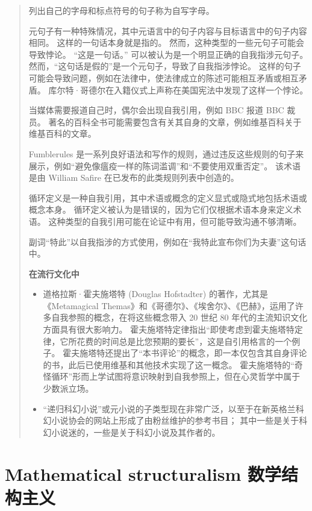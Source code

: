 \begin{quote}
列出自己的字母和标点符号的句子称为自写字母。

元句子有一种特殊情况，其中元语言中的句子内容与目标语言中的句子内容相同。
这样的一句话本身就是指的。 然而，这种类型的一些元句子可能会导致悖论。
``这是一句话。'' 可以被认为是一个明显正确的自我指涉元句子。
然而，``这句话是假的''是一个元句子，导致了自我指涉悖论。
这样的句子可能会导致问题，例如在法律中，使法律成立的陈述可能相互矛盾或相互矛盾。
库尔特·哥德尔在入籍仪式上声称在美国宪法中发现了这样一个悖论。

当媒体需要报道自己时，偶尔会出现自我引用，例如 BBC 报道 BBC 裁员。
著名的百科全书可能需要包含有关其自身的文章，例如维基百科关于维基百科的文章。

Fumblerules
是一系列良好语法和写作的规则，通过违反这些规则的句子来展示，例如``避免像瘟疫一样的陈词滥调''和``不要使用双重否定''。
该术语是由 William Safire 在已发布的此类规则列表中创造的。

循环定义是一种自我引用，其中术语或概念的定义显式或隐式地包括术语或概念本身。
循环定义被认为是错误的，因为它们仅根据术语本身来定义术语。
这种类型的自我引用可能在论证中有用，但可能导致沟通不够清晰。

副词``特此''以自我指涉的方式使用，例如在``我特此宣布你们为夫妻''这句话中。

\textbf{在流行文化中}

\begin{itemize}
\tightlist{}
\item
  道格拉斯·霍夫施塔特 (Douglas Hofstadter) 的著作，尤其是《Metamagical
  Themas》和《哥德尔》、《埃舍尔》、《巴赫》，运用了许多自我参照的概念，在将这些概念带入
  20 世纪 80 年代的主流知识文化方面具有很大影响力。
  霍夫施塔特定律指出``即使考虑到霍夫施塔特定律，它所花费的时间总是比您预期的要长''，这是自引用格言的一个例子。
  霍夫施塔特还提出了``本书评论''的概念，即一本仅包含其自身评论的书，此后已使用维基和其他技术实现了这一概念。
  霍夫施塔特的``奇怪循环''形而上学试图将意识映射到自我参照上，但在心灵哲学中属于少数派立场。
\item
  ``递归科幻小说''或元小说的子类型现在非常广泛，以至于在新英格兰科幻小说协会的网站上形成了由粉丝维护的参考书目；
  其中一些是关于科幻小说迷的，一些是关于科幻小说及其作者的。
\end{itemize}
\end{quote}

\section{Mathematical structuralism
数学结构主义}\label{mathematical-structuralism-ux6570ux5b66ux7ed3ux6784ux4e3bux4e49}

